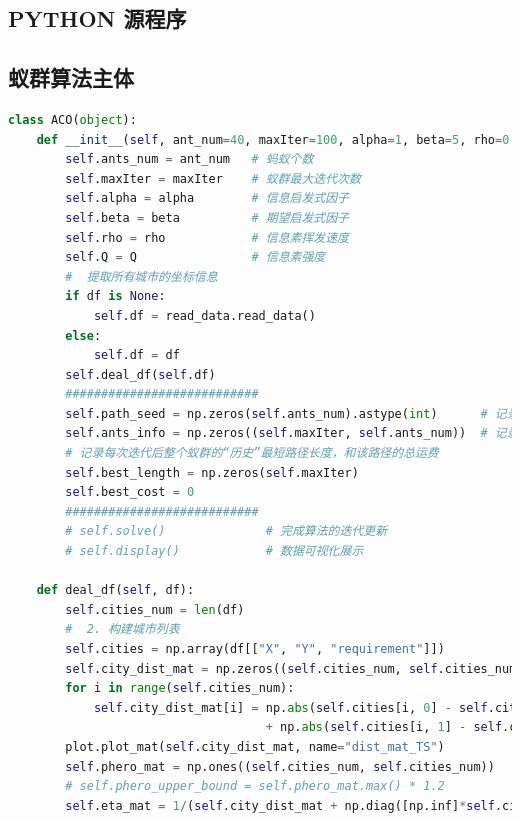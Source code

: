 \documentclass{cumcmthesis}
\begin{document}
\begin{appendices}
		
\section{PYTHON 源程序}
\subsection{蚁群算法主体}
\begin{lstlisting}[language=Python]%设置不同语言即可。
class ACO(object):
    def __init__(self, ant_num=40, maxIter=100, alpha=1, beta=5, rho=0.1, Q=1, df=None):
        self.ants_num = ant_num   # 蚂蚁个数
        self.maxIter = maxIter    # 蚁群最大迭代次数
        self.alpha = alpha        # 信息启发式因子
        self.beta = beta          # 期望启发式因子
        self.rho = rho            # 信息素挥发速度
        self.Q = Q                # 信息素强度
        #  提取所有城市的坐标信息
        if df is None:
            self.df = read_data.read_data()
        else:
            self.df = df
        self.deal_df(self.df)
        ###########################
        self.path_seed = np.zeros(self.ants_num).astype(int)      # 记录一次迭代过程中每个蚂蚁的初始城市下标
        self.ants_info = np.zeros((self.maxIter, self.ants_num))  # 记录每次迭代后所有蚂蚁的路径长度信息
        # 记录每次迭代后整个蚁群的“历史”最短路径长度，和该路径的总运费
        self.best_length = np.zeros(self.maxIter)
        self.best_cost = 0
        ###########################
        # self.solve()              # 完成算法的迭代更新
        # self.display()            # 数据可视化展示

    def deal_df(self, df):
        self.cities_num = len(df)                                                   # 1. 获取城市个数
        #  2. 构建城市列表
        self.cities = np.array(df[["X", "Y", "requirement"]])
        self.city_dist_mat = np.zeros((self.cities_num, self.cities_num))                  # 3. 构建城市距离矩阵
        for i in range(self.cities_num):
            self.city_dist_mat[i] = np.abs(self.cities[i, 0] - self.cities[:, 0]) \
                                    + np.abs(self.cities[i, 1] - self.cities[:, 1])
        plot.plot_mat(self.city_dist_mat, name="dist_mat_TS")
        self.phero_mat = np.ones((self.cities_num, self.cities_num))                       # 4. 初始化信息素矩阵
        # self.phero_upper_bound = self.phero_mat.max() * 1.2                              #b信息素浓度上限
        self.eta_mat = 1/(self.city_dist_mat + np.diag([np.inf]*self.cities_num))          # 5. 初始化启发函数矩阵


\end{lstlisting}
\end{appendices}
\end{document}
